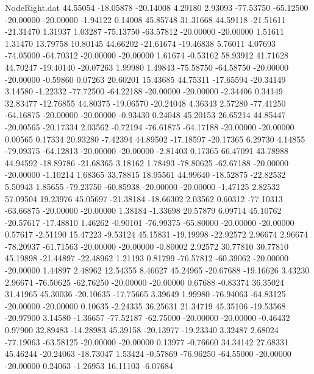 \begin{filecontents}{NodeRight.dat}
  44.55054  -18.05878  -20.14008     4.29180    2.93093  -77.53750  -65.12500  -20.00000  -20.00000   -1.94122    0.14008   45.85748   31.31668
  44.59118  -21.51611  -21.31470     1.31937    1.03287  -75.13750  -63.57812  -20.00000  -20.00000    1.51611    1.31470   13.79758   10.80145
  44.66202  -21.61674  -19.46838     5.76011    4.07693  -74.05000  -64.70312  -20.00000  -20.00000    1.61674   -0.53162   58.93912   41.71628
  44.70247  -19.40140  -20.07263     1.99980    1.49843  -75.58750  -64.58750  -20.00000  -20.00000   -0.59860    0.07263   20.60201   15.43685
  44.75311  -17.65594  -20.34149     3.14580   -1.22332  -77.72500  -64.22188  -20.00000  -20.00000   -2.34406    0.34149   32.83477  -12.76855
  44.80375  -19.06570  -20.24048     4.36343    2.57280  -77.41250  -64.16875  -20.00000  -20.00000   -0.93430    0.24048   45.20153   26.65214
  44.85447  -20.00565  -20.17334     2.03562   -0.72194  -76.61875  -64.17188  -20.00000  -20.00000    0.00565    0.17334   20.93280   -7.42394
  44.89502  -17.18597  -20.17365     6.29730    4.14855  -79.09375  -64.12813  -20.00000  -20.00000   -2.81403    0.17365   66.47091   43.78988
  44.94592  -18.89786  -21.68365     3.18162    1.78493  -78.80625  -62.67188  -20.00000  -20.00000   -1.10214    1.68365   33.78815   18.95561
  44.99640  -18.52875  -22.82532     5.50943    1.85655  -79.23750  -60.85938  -20.00000  -20.00000   -1.47125    2.82532   57.09504   19.23976
  45.05697  -21.38184  -18.66302     2.03562    0.60312  -77.10313  -63.66875  -20.00000  -20.00000    1.38184   -1.33698   20.57879    6.09714
  45.10762  -20.57617  -17.48810     1.46262   -0.90101  -76.99375  -65.80000  -20.00000  -20.00000    0.57617   -2.51190   15.47223   -9.53124
  45.15831  -19.19998  -22.92572     2.96674    2.96674  -78.20937  -61.71563  -20.00000  -20.00000   -0.80002    2.92572   30.77810   30.77810
  45.19898  -21.44897  -22.48962     1.21193    0.81799  -76.57812  -60.39062  -20.00000  -20.00000    1.44897    2.48962   12.54355    8.46627
  45.24965  -20.67688  -19.16626     3.43230    2.96674  -76.50625  -62.76250  -20.00000  -20.00000    0.67688   -0.83374   36.35024   31.41965
  45.30036  -20.10635  -17.75665     3.39649    1.99980  -76.94063  -64.83125  -20.00000  -20.00000    0.10635   -2.24335   36.25631   21.34719
  45.35106  -19.53568  -20.97900     3.14580   -1.36657  -77.52187  -62.75000  -20.00000  -20.00000   -0.46432    0.97900   32.89483  -14.28983
  45.39158  -20.13977  -19.23340     3.32487    2.68024  -77.19063  -63.58125  -20.00000  -20.00000    0.13977   -0.76660   34.34142   27.68331
  45.46244  -20.24063  -18.73047     1.53424   -0.57869  -76.96250  -64.55000  -20.00000  -20.00000    0.24063   -1.26953   16.11103   -6.07684

\end{filecontents}
